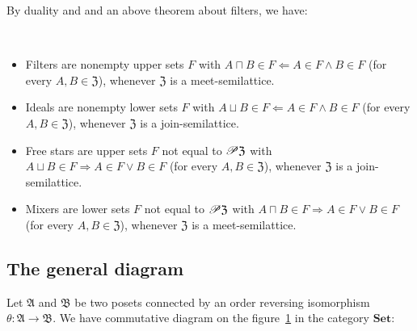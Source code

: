 By duality and and an above theorem about filters, we have:
\begin{prop}
~
\begin{itemize}
\item Filters are nonempty upper sets $F$ with $A\sqcap B\in F\Leftarrow A\in F\land B\in F$
(for every $A,B\in\mathfrak{Z}$), whenever $\mathfrak{Z}$ is a meet-semilattice.
\item Ideals are nonempty lower sets $F$ with $A\sqcup B\in F\Leftarrow A\in F\land B\in F$
(for every $A,B\in\mathfrak{Z}$), whenever $\mathfrak{Z}$ is a join-semilattice.
\item Free stars are upper sets $F$ not equal to $\mathscr{P}\mathfrak{Z}$
with $A\sqcup B\in F\Rightarrow A\in F\lor B\in F$ (for every $A,B\in\mathfrak{Z}$),
whenever $\mathfrak{Z}$ is a join-semilattice.
\item Mixers are lower sets $F$ not equal to $\mathscr{P}\mathfrak{Z}$ with
$A\sqcap B\in F\Rightarrow A\in F\lor B\in F$ (for every $A,B\in\mathfrak{Z}$),
whenever $\mathfrak{Z}$ is a meet-semilattice.
\end{itemize}
\end{prop}

\subsection{The general diagram}

Let $\mathfrak{A}$ and $\mathfrak{B}$ be two posets connected by
an order reversing isomorphism $\theta:\mathfrak{A}\rightarrow\mathfrak{B}$.
We have commutative diagram on the figure~\ref{theta-sets} in the
category $\mathbf{Set}$:

\begin{figure}[ht]
\caption{\label{theta-sets}}
\end{figure}

